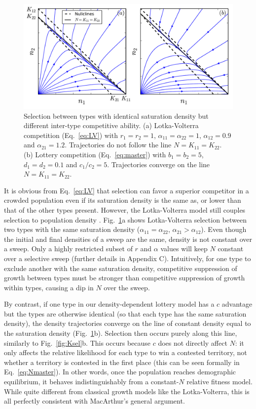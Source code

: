 \documentclass[12pt]{article}
\begin{document}
\begin{figure}
\centering
\includegraphics[scale=0.8]{LVvslottery.pdf}
\caption{\label{fig:LVvslottery} Selection between types with identical saturation density but different inter-type competitive ability. (a) Lotka-Volterra competition (Eq.~\ref{eq:LV}) with $r_1=r_2=1$, $\alpha_{11}=\alpha_{22}=1$, $\alpha_{12}=0.9$ and $\alpha_{21}=1.2$. Trajectories do not follow the line $N=K_{11}=K_{22}$. (b) Lottery competition (Eq.~\ref{eq:master}) with $b_1=b_2=5$, $d_1=d_2=0.1$ and $c_1/c_2=5$. Trajectories converge on the line $N=K_{11}=K_{22}$.}
\end{figure}

It is obvious from Eq.~\eqref{eq:LV} that selection can favor a superior competitor in a crowded population even if its saturation density is the same as, or lower than that of the other types present. However, the Lotka-Volterra model still couples selection to population density \citep{smouse_1976}. Fig.~\ref{fig:LVvslottery}a shows Lotka-Volterra selection between two types with the same saturation density ($\alpha_{11}=\alpha_{22}$, $\alpha_{21}>\alpha_{12}$). Even though the initial and final densities of a sweep are the same, density is not constant over a sweep. Only a highly restricted subset of $r$ and $\alpha$ values will keep $N$ constant over a selective sweep (further details in Appendix C). Intuitively, for one type to exclude another with the same saturation density, competitive suppression of growth between types must be stronger than competitive suppression of growth within types, causing a dip in $N$ over the sweep. 

By contrast, if one type in our density-dependent lottery model has a $c$ advantage but the types are otherwise identical (so that each type has the same saturation density), the density trajectories converge on the line of constant density equal to the saturation density (Fig.~\ref{fig:LVvslottery}b). Selection then occurs purely along this line, similarly to Fig.~\ref{fig:Ksel}b. This occurs because $c$ does not directly affect $N$: it only affects the relative likelihood for each type to win a contested territory, not whether a territory is contested in the first place (this can be seen formally in Eq.~\eqref{eq:Nmaster}). In other words, once the population reaches demographic equilibrium, it behaves indistinguishably from a constant-$N$ relative fitness model. While quite different from classical growth models like the Lotka-Volterra, this is all perfectly consistent with MacArthur's general argument. 
\end{document}
